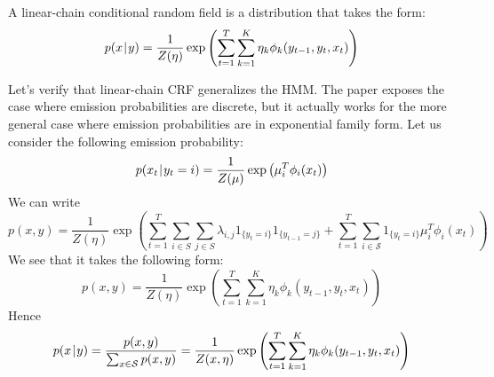 \documentclass[a4paper, 11pt]{article}
\newcommand{\pcond}[2]{p(#1 \hspace{-.2em}\mid\hspace{-.2em} #2)}
\begin{document}
A linear-chain conditional random field is a distribution that takes
the form:
\begin{equation}
  \label{eq:lccrf}
  \pcond{x}{y} = \dfrac{1}{Z(\eta)} \exp{\left(
      \sum_{t=1}^T \sum_{k=1}^K \eta_k \phi_k(y_{t-1}, y_t, x_t)
    \right)}
\end{equation}

Let's verify that linear-chain CRF generalizes the HMM. The paper
exposes the case where emission probabilities are discrete, but
it actually works for the more general case where emission probabilities are in
exponential family form.
Let us consider the following emission probability:
\begin{equation}
  \pcond{x_t}{y_t = i} = \dfrac{1}{Z(\mu)} \exp{\left(\mu_i^T\phi_i(x_t)\right)}
\end{equation}
We can write
\begin{equation}
  p(x, y) = \dfrac{1}{Z(\eta)} \exp{\left(
      \sum_{t=1}^T \sum_{i \in S} \sum_{j \in S} \lambda_{i,j} 1_{\{y_t = i\}}1_{\{y_{t-1} = j\}}
      + \sum_{t=1}^T \sum_{i \in \mathcal{S}} 1_{\{y_t = i\}} \mu_i^T \phi_i(x_t)
    \right)}
\end{equation}
We see that it takes the following form:
\begin{displaymath}
  p(x, y) = \dfrac{1}{Z(\eta)} \exp{\left(
      \sum_{t=1}^T \sum_{k=1}^K \eta_k \phi_k(y_{t-1}, y_t, x_t)
    \right)}
\end{displaymath}
Hence
\begin{equation}
  \pcond{x}{y} = \dfrac{p(x, y)}{\sum_{x \in \mathcal{S}} p(x, y)} =
  \dfrac{1}{Z(x, \eta)} \exp{\left(
      \sum_{t=1}^T \sum_{k=1}^K \eta_k \phi_k(y_{t-1}, y_t, x_t)
    \right)}
\end{equation}
\end{document}
